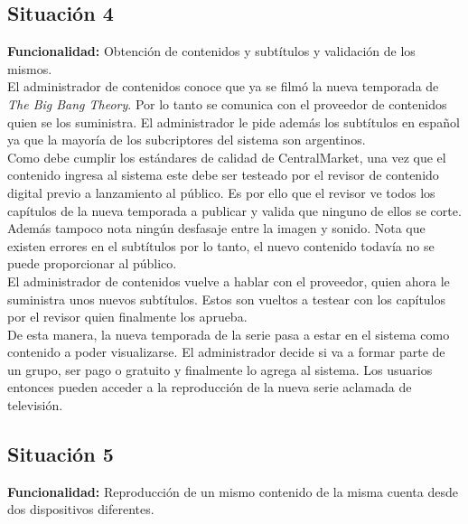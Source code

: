 \documentclass[11pt, a4paper, spanish]{article}
\begin{document}
\subsection{Situaci\'on 4}

	\textbf{Funcionalidad:} Obtenci\'on de contenidos y subt\'itulos y validaci\'on de los mismos.\\

        El administrador de contenidos conoce que ya se film\'o la nueva temporada de \emph{The Big Bang Theory}. Por lo tanto se comunica con el 
   proveedor de contenidos quien se los suministra. El administrador le pide adem\'as los subt\'itulos en espa\~{n}ol ya que la mayor\'ia de los subcriptores del 
   sistema son argentinos.\\

        Como debe cumplir los est\'andares de calidad de CentralMarket, una vez que el contenido ingresa al sistema este debe ser testeado por el revisor 
   de contenido digital previo a lanzamiento al p\'ublico. Es por ello que el revisor ve todos los cap\'itulos de la nueva temporada a publicar y valida 
   que ninguno de ellos se corte. Adem\'as tampoco nota ning\'un desfasaje entre la imagen y sonido. Nota que existen errores en el subt\'itulos por lo 
   tanto, el nuevo contenido todav\'ia no se puede proporcionar al p\'ublico.\\
   
      El administrador de contenidos vuelve a hablar con el proveedor, quien ahora le suministra unos nuevos subt\'itulos. Estos son vueltos a testear 
   con los cap\'itulos por el revisor quien finalmente los aprueba.\\

      De esta manera, la nueva temporada de la serie pasa a estar en el sistema como contenido a poder visualizarse. El administrador decide si va a    
   formar parte de un grupo, ser pago o gratuito y finalmente lo agrega al sistema.
   Los usuarios entonces pueden acceder a la reproducci\'on de la nueva serie aclamada de televisi\'on.

\newpage

\subsection{Situaci\'on 5}

	\textbf{Funcionalidad:} Reproducci\'on de un mismo contenido de la misma cuenta desde dos dispositivos diferentes.\\
\end{document}

